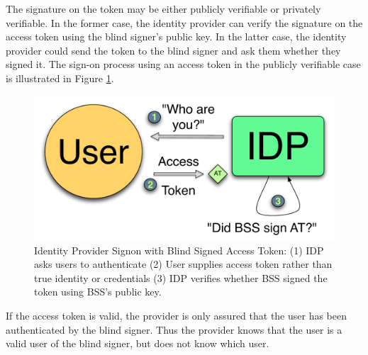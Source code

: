\documentclass{llncs}
\begin{document}
The signature on the token may be either publicly verifiable or
privately verifiable. In the former case, the identity provider can
verify the signature on the access token using the blind signer's
public key. In the latter case, the identity provider could send the
token to the blind signer and ask them whether they signed it. The
sign-on process using an access token in the publicly verifiable case
is illustrated in Figure \ref{fig:bss-signon}.

\begin{figure}
  \centering
  \includegraphics[scale=0.6]{figs/fig-bss-signon-color.pdf}
  \caption{Identity Provider Signon with Blind Signed Access Token: (1) IDP asks
  users to authenticate (2) User supplies access token rather than true identity
  or credentials (3) IDP verifies whether BSS signed the token using BSS's
  public key.}
  \label{fig:bss-signon}
\end{figure}

If the access token is valid, the provider is only assured that the
user has been authenticated by the blind signer. Thus the provider
knows that the user is a valid user of the blind signer, but does not
know which user.
\end{document}
